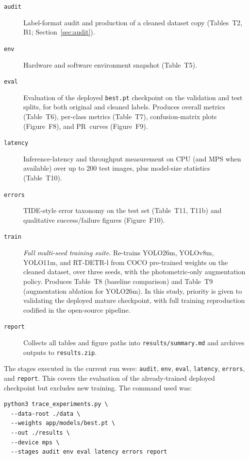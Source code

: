 \begin{description}
  \item[\texttt{audit}]
    Label-format audit and production of a cleaned dataset copy
    (Tables~T2, B1; Section~\ref{sec:audit}).

  \item[\texttt{env}]
    Hardware and software environment snapshot (Table~T5).

  \item[\texttt{eval}]
    Evaluation of the deployed \texttt{best.pt} checkpoint on the validation
    and test splits, for both original and cleaned labels.
    Produces overall metrics (Table~T6), per-class metrics (Table~T7),
    confusion-matrix plots (Figure~F8), and PR~curves (Figure~F9).

  \item[\texttt{latency}]
    Inference-latency and throughput measurement on CPU
    (and MPS when available) over up to 200 test images, plus model-size
    statistics (Table~T10).

  \item[\texttt{errors}]
    TIDE-style error taxonomy on the test set (Table~T11, T11b) and
    qualitative success/failure figures (Figure~F10).

  \item[\texttt{train}] \emph{Full multi-seed training suite.}
    Re-trains YOLO26m, YOLOv8m, YOLO11m, and RT-DETR-l from COCO
    pre-trained weights on the cleaned dataset, over three seeds, with the
    photometric-only augmentation policy.
    Produces Table~T8 (baseline comparison) and Table~T9 (augmentation
    ablation for YOLO26m).
    In this study, priority is given to validating the deployed mature checkpoint,
    with full training reproduction codified in the open-source pipeline.

  \item[\texttt{report}]
    Collects all tables and figure paths into
    \texttt{results/summary.md} and archives outputs to
    \texttt{results.zip}.
\end{description}

The stages executed in the current run were:
\texttt{audit}, \texttt{env}, \texttt{eval}, \texttt{latency},
\texttt{errors}, and \texttt{report}.
This covers the evaluation of the already-trained deployed checkpoint
but excludes new training.
The command used was:

\begin{verbatim}
python3 trace_experiments.py \
  --data-root ./data \
  --weights app/models/best.pt \
  --out ./results \
  --device mps \
  --stages audit env eval latency errors report
\end{verbatim}

